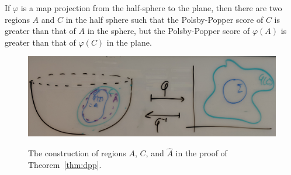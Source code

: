 






\begin{theorem}\label{thm:dpp}
	If $\varphi$ is a map projection from the half-sphere to the plane, then there are two regions $A$ and $C$ in the half sphere such that the Polsby-Popper score of $C$ is greater than that of $A$ in the sphere, but the Polsby-Popper score of $\varphi(A)$ is greater than that of $\varphi(C)$ in the plane.
\end{theorem}
\begin{figure}\label{fig:dpp}
\centering
\includegraphics[width=.9\textwidth]{figs/dumb_pp_cropped.jpg}\\[1.5em]
\caption{ The construction of regions $A$, $C$, and $\hat{A}$ in the proof of Theorem~\ref{thm:dpp}.}
\end{figure}


